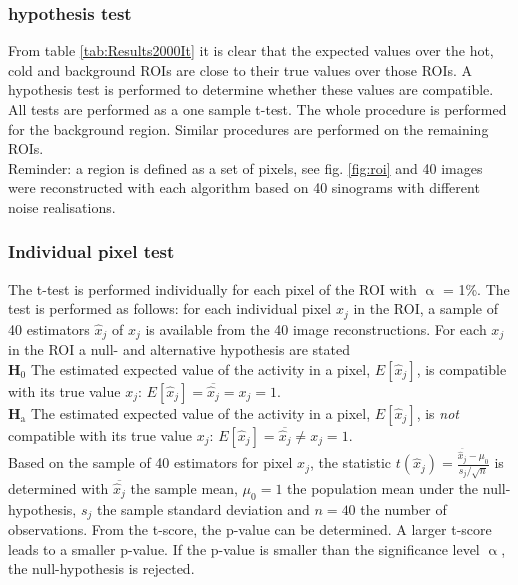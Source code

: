 \documentclass[report,12pt]{report}
\newcommand{\subscript}[1]{\ensuremath{_{\textrm{#1}}}}
\begin{document}
\subsubsection*{hypothesis test}
From table \ref{tab:Results2000It} it is clear that the expected values over the hot, cold and background ROIs are close to their true values over those ROIs. A hypothesis test is performed to determine whether these values are compatible. All tests are performed as a one sample t-test. The whole procedure is performed for the background region. Similar procedures are performed on the remaining ROIs.\\

Reminder: a region is defined as a set of pixels, see fig. \ref{fig:roi} and 40 images were reconstructed with each algorithm based on 40 sinograms with different noise realisations.\\ 




\subsubsection*{Individual pixel test}
The t-test is performed individually for each pixel of the ROI with $\upalpha$ = 1\%. The test is performed as follows: for each individual pixel $x_j$ in the ROI, a sample of 40 estimators $\hat x_j$ of $x_j$ is available from the 40 image reconstructions. For each $x_j$ in the ROI a null- and alternative hypothesis are stated\\

\textbf{H\subscript{0}} The estimated expected value of the activity in a pixel, $E[\hat x_{j}]$, is compatible with its true value $x_j$: $E[\hat x_{j}] = \overline{\hat x_{j}} = x_j = 1$.\\

\textbf{H\subscript{a}} The estimated expected value of the activity in a pixel, $E[\hat x_{j}]$, is \emph{not} compatible with its true value $x_j$: $E[\hat x_{j}] = \overline{\hat x_{j}} \neq x_j = 1$.\\


Based on the sample of 40 estimators for pixel $x_j$, the statistic $t(\hat x_{j}) = \frac{\overline{\hat x_{j}} - \mu_0}{s_{j} / \sqrt{n}}$ is determined with $\overline{\hat x_{j}}$ the sample mean, $\mu_0 = 1$ the population mean under the null-hypothesis, $s_j$ the sample standard deviation and $n = 40$ the number of observations. From the t-score, the p-value can be determined. A larger t-score leads to a smaller p-value. If the p-value is smaller than the significance level $\upalpha$, the null-hypothesis is rejected. 
\end{document}
